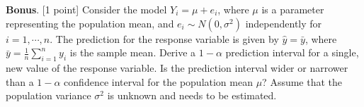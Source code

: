 \documentclass[11pt]{article}\usepackage[]{graphicx}\usepackage[]{color}
\begin{document}
\textbf{Bonus}. [1 point]  Consider the model $Y_i = \mu + e_i$, where $\mu$ is a parameter representing the population mean, and $e_i \sim N(0, \sigma^2)$ independently for $i=1,\cdots,n$.  The prediction for the response variable is given by $\hat{y} = \bar{y}$, where $\bar{y} = \frac{1}{n} \sum_{i=1}^n y_i$ is the sample mean.  Derive a $1-\alpha$ prediction interval for a single, new value of the response variable.  Is the prediction interval wider or narrower than a $1-\alpha$ confidence interval for the population mean $\mu$?  Assume that the population variance $\sigma^2$ is unknown and needs to be estimated.\\



% 
% 
\end{document}
